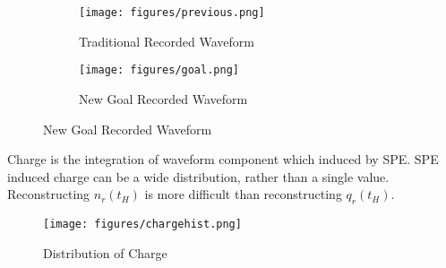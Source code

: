 \begin{figure}[H]
\begin{minipage}{.5\textwidth}
\begin{figure}[H]
    \centering
    \texttt{[image: figures/previous.png]}
    \caption{\label{fig:tradi} Traditional Recorded Waveform}
\end{figure}
\end{minipage}
\begin{minipage}{.5\textwidth}
\begin{figure}[H]
    \centering
    \texttt{[image: figures/goal.png]}
    \caption{\label{fig:new} New Goal Recorded Waveform}
\end{figure}
\end{minipage}
\end{figure}

Charge is the integration of waveform component which induced by SPE. SPE induced charge can be a wide distribution, rather than a single value. Reconstructing $n_{r}(t_{H})$ is more difficult than reconstructing $q_{r}(t_{H})$. 

\begin{figure}[H]
    \centering
    \texttt{[image: figures/chargehist.png]}
    \caption{\label{fig:charge} Distribution of Charge}
\end{figure}

